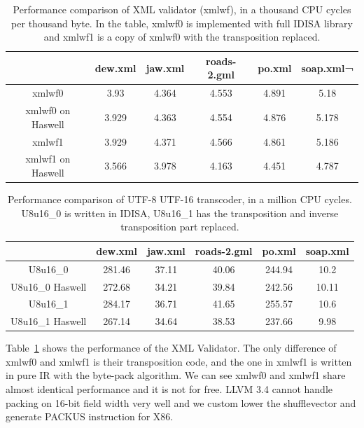 \begin{table}[h]
\centering
\begin{tabular}{|c|c|c|c|c|c|}
\hline
        & dew.xml  &  jaw.xml  &  roads-2.gml  &  po.xml  & soap.xml¬ \\\hline
xmlwf0   &  3.93   &    4.364   &   4.553   &   4.891   &   5.18 \\ \hline
xmlwf0 on Haswell   &  3.929   &   4.363   &   4.554   &   4.876   &   5.178 \\ \hline

xmlwf1   &  3.929   &   4.371   &   4.566   &   4.861   &   5.186 \\ \hline
xmlwf1 on Haswell &   3.566   &   3.978   &   4.163   &   4.451   &   4.787 \\ \hline
\end{tabular}
\caption[Performance comparison of XML Validator (xmlwf)]{Performance comparison of XML validator (xmlwf), in a thousand CPU cycles per thousand byte. In the table, xmlwf0 is implemented with full IDISA library and xmlwf1 is a copy of xmlwf0 with the transposition replaced.}
\label{table:xmlwf_perf}
\end{table}

\begin{table}[h]
\centering
\begin{tabular}{|c|c|c|c|c|c|}
\hline
 & dew.xml & jaw.xml & roads-2.gml & po.xml & soap.xml \\ \hline
 U8u16\_0         & 281.46  & 37.11   & 40.06       & 244.94 & 10.2     \\ \hline
 U8u16\_0 Haswell & 272.68  & 34.21   & 39.84       & 242.56 & 10.11    \\ \hline
 U8u16\_1         & 284.17  & 36.71   & 41.65       & 255.57 & 10.6     \\ \hline
 U8u16\_1 Haswell & 267.14  & 34.64   & 38.53       & 237.66 & 9.98     \\ \hline
 \end{tabular}
 \caption[Performance comparison of UTF-8 UTF-16 Transcoder]{Performance comparison of UTF-8 UTF-16 transcoder, in a million CPU cycles. U8u16\_0 is written in IDISA, U8u16\_1 has the transposition and inverse transposition part replaced.}
 \label{table:u8u16_perf}
 \end{table}

Table~\ref{table:xmlwf_perf} shows the performance of the XML Validator. The only difference of xmlwf0 and xmlwf1 is their transposition code, and the one in xmlwf1 is written in pure IR with the byte-pack algorithm. We can see xmlwf0 and xmlwf1 share almost identical performance and it is not for free. LLVM 3.4 cannot handle packing on 16-bit field width very well and we custom lower the shufflevector and generate PACKUS instruction for X86.

